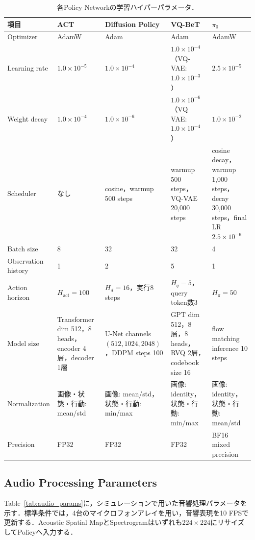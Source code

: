 \documentclass{article}
\begin{document}
\begin{table}[t]
\centering
\scriptsize
\setlength{\tabcolsep}{3pt}
\caption{各Policy Networkの学習ハイパーパラメータ．}
\label{tab:hyperparams}
\begin{tabular}{p{} p{} p{} p{} p{}}
\hline
項目 & ACT & Diffusion Policy & VQ-BeT & $\pi_0$ \\
\hline
Optimizer & AdamW & Adam & Adam & AdamW \\
Learning rate & $1.0\times10^{-5}$ & $1.0\times10^{-4}$ & $1.0\times10^{-4}$（VQ-VAE: $1.0\times10^{-3}$） & $2.5\times10^{-5}$ \\
Weight decay & $1.0\times10^{-4}$ & $1.0\times10^{-6}$ & $1.0\times10^{-6}$（VQ-VAE: $1.0\times10^{-4}$） & $1.0\times10^{-2}$ \\
Scheduler & なし & cosine，warmup 500 steps & warmup 500 steps，VQ-VAE 20,000 steps & cosine decay，warmup 1,000 steps，decay 30,000 steps，final LR $2.5\times10^{-6}$ \\
Batch size & 8 & 32 & 32 & 4 \\
Observation history & 1 & 2 & 5 & 1 \\
Action horizon & $H_{\mathrm{act}}=100$ & $H_d=16$，実行8 steps & $H_q=5$，query token数3 & $H_\pi=50$ \\
Model size & Transformer dim 512，8 heads，encoder 4層，decoder 1層 & U-Net channels $(512,1024,2048)$，DDPM steps 100 & GPT dim 512，8層，8 heads，RVQ 2層，codebook size 16 & flow matching inference 10 steps \\
Normalization & 画像・状態・行動: mean/std & 画像: mean/std，状態・行動: min/max & 画像: identity，状態・行動: min/max & 画像: identity，状態・行動: mean/std \\
Precision & FP32 & FP32 & FP32 & BF16 mixed precision \\
\hline
\end{tabular}
\end{table}




\subsection{Audio Processing Parameters}
\label{sec:appendix_audio_params}
Table~\ref{tab:audio_params}に，シミュレーションで用いた音響処理パラメータを示す．標準条件では，4台のマイクロフォンアレイを用い，音響表現を10 FPSで更新する．Acoustic Spatial MapとSpectrogramはいずれも$224\times224$にリサイズしてPolicyへ入力する．
\end{document}
